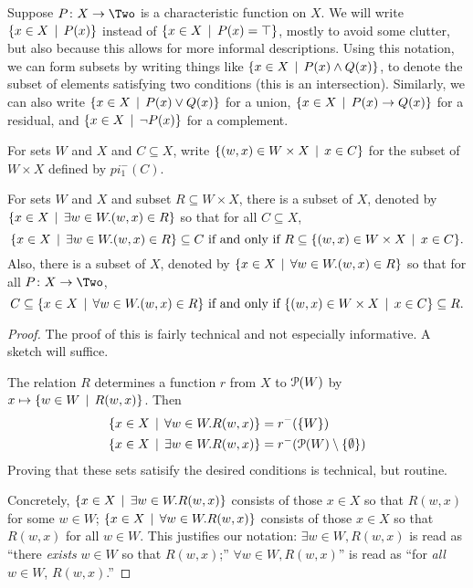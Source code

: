 Suppose $\fromto PX\Two$ is a characteristic function on $X$.
We will write $\{x\in X\,\mid\, P(x)\}$ instead of $\{x\in X\,\mid\, P(x)=\top\}$, mostly to avoid some clutter, but also because this allows for more informal descriptions.
Using this notation, we can form subsets by writing things like $\{x\in X\,\mid\, P(x)\wedge Q(x)\}$, to denote the subset of elements satisfying two conditions (this is an intersection).
Similarly, we can also write $\{x\in X\,\mid\, P(x)\vee Q(x)\}$ for a union,
$\{x\in X\,\mid\, P(x)\to Q(x)\}$ for a residual, and $\{x\in X\,\mid\, \neg P(x)\}$ for a complement.

\begin{defn}
	For sets $W$ and $X$ and $C\subseteq X$, write $\{(w,x)\in W\times X\,\mid\, x\in C\}$ for the subset of $W\times X$ defined by $pi_1^-(C)$.
\end{defn}

\begin{lemma}
	For sets $W$ and $X$ and subset $R\subseteq{W\times X}$, there is a subset of $X$, denoted by $\{x\in X\,\mid\, \exists w\in W.(w,x)\in R\}$ so that for all $C\subseteq X$, 
	\[\text{$\{x\in X\,\mid\, \exists w\in W.(w,x)\in R\} \subseteq C$ if and only if $R \subseteq \{(w,x)\in W\times X\,\mid\, x\in C\}$}.\]
	Also, there is a subset of $X$, denoted by $\{x\in X\,\mid\, \forall w\in W.(w,x)\in R\}$ so that for all $\fromto PX\Two$,
	\[\text{$C \subseteq \{x\in X\,\mid\, \forall w\in W.(w,x)\in R\}$ if and only if $\{(w,x) \in W\times X\,\mid\, x\in C\}\subseteq R$}.\]

	\begin{proof}
		The proof of this is fairly technical and not especially informative. A sketch will suffice.
		
		The relation $R$ determines a function $r$ from $X$ to ${\mathcal{P}}(W)$ by $x\mapsto \{w\in W\,\mid\, R(w,x)\}$.
		Then 
		\begin{align*}
			\{x\in X\,\mid\, \forall w\in W.R(w,x)\} &= r^-(\{W\})\\
			\{x\in X\,\mid\, \exists w\in W.R(w,x)\} &= r^-({\mathcal{P}}(W)\setminus\{\emptyset\})
		\end{align*}
		Proving that these sets satisify the desired conditions is technical, but routine.
		 
		Concretely, $\{x\in X\,\mid\, \exists w\in W.R(w,x)\}$ consists of those $x\in X$ so that $R(w,x)$ for some $w\in W$;
		$\{x\in X\,\mid\, \forall w\in W.R(w,x)\}$ consists of those $x\in X$ so that $R(w,x)$ for all $w\in W$.
		This justifies our notation: $\exists w\in W,R(w,x)$ is read as ``there \emph{exists} $w\in W$ so that $R(w,x)$;''
		$\forall w\in W, R(w,x)$'' is read as ``for \emph{all} $w\in W$, $R(w,x)$.''
	\end{proof}
\end{lemma}

